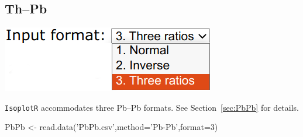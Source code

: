 \begin{refsection}

\chapter{Th--Pb}
\label{ch:ThPb-R}

\noindent\begin{minipage}[t]{.3\linewidth}
\strut\vspace*{-\baselineskip}\newline
\includegraphics[width=\linewidth]{../figures/PbPbFormats.png}
\end{minipage}
\begin{minipage}[t]{.7\textwidth}
  \texttt{IsoplotR} accommodates three Pb--Pb formats. See
  Section~\ref{sec:PbPb} for details.
\end{minipage}

\begin{console}
PbPb <- read.data('PbPb.csv',method='Pb-Pb',format=3)
\end{console}


\end{refsection}
